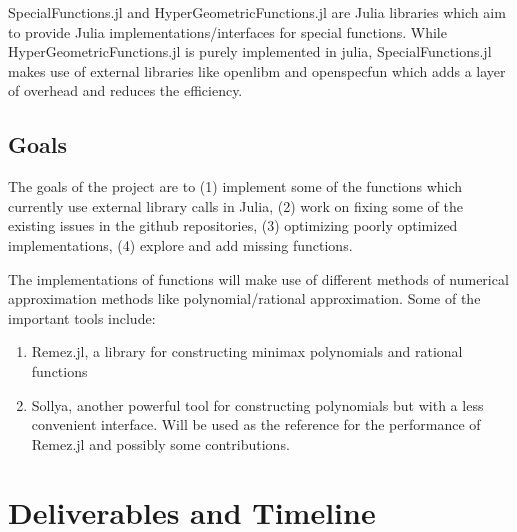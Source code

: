\documentclass{article}
\theoremstyle{mytheoremstyle}
\theoremstyle{mytheoremstyle}
\theoremstyle{myproblemstyle}
\begin{document}
    SpecialFunctions.jl and HyperGeometricFunctions.jl are Julia libraries which aim to provide Julia implementations/interfaces for special functions.
    While HyperGeometricFunctions.jl is purely implemented in julia, SpecialFunctions.jl makes use of external libraries like openlibm and openspecfun which adds a layer of overhead and reduces the efficiency.



    
    \subsection*{Goals}\label{sub:Goals} %
      The goals of the project are to (1) implement some of the functions which currently use external library calls in Julia, (2) work on fixing some of the existing issues in the github repositories, (3) optimizing poorly optimized implementations, (4) explore and add missing functions. 

      The implementations of functions will make use of different methods  of numerical approximation methods like polynomial/rational approximation. 
      Some of the important tools include: \begin{enumerate}
        \item Remez.jl, a library for constructing minimax polynomials and rational functions 
        \item Sollya, another powerful tool for constructing polynomials but with a less convenient interface. Will be used as the reference for the performance of Remez.jl and possibly some contributions.
      \end{enumerate}
    
  \section*{Deliverables and Timeline}\label{sec:Methods} %
\end{document}
